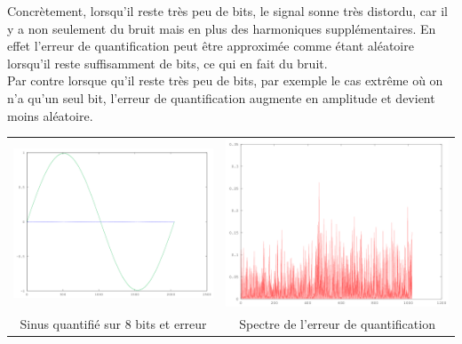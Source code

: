 \documentclass{article}
\begin{document}
Concrètement, lorsqu'il reste très peu de bits, le signal sonne très distordu, car il y a non seulement du bruit mais en plus des harmoniques supplémentaires. En effet l'erreur de quantification peut être approximée comme étant aléatoire lorsqu'il reste suffisamment de bits, ce qui en fait du bruit.
\\
Par contre lorsque qu'il reste très peu de bits, par exemple le cas extrême où on n'a qu'un seul bit, l'erreur de quantification augmente en amplitude et devient moins aléatoire.
\\
\begin{tabular}{c c}

\includegraphics[width = 8 cm]{err_quantif_8bit_t.png} & \includegraphics[width = 8 cm]{err_quantif_8bit_f.png}
\\
Sinus quantifié sur 8 bits et erreur & Spectre de l'erreur de quantification
\\

\end{tabular}
\end{document}
